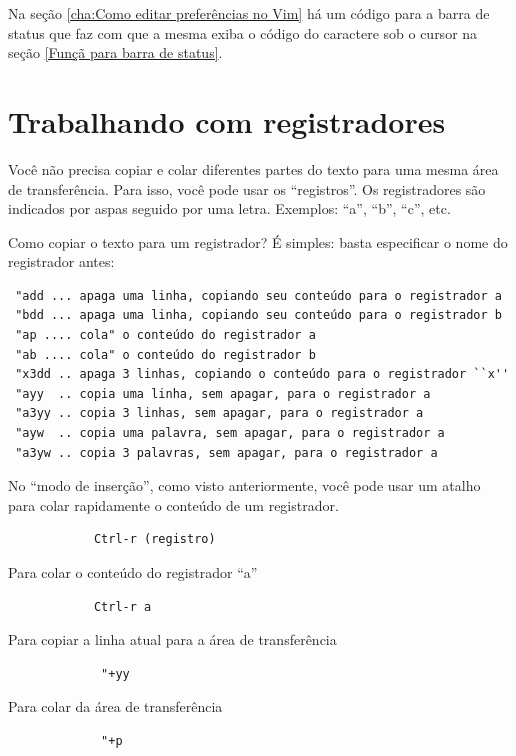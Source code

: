 \documentclass[10pt,a4paper,openany]{book}
\begin{document}
Na seção \ref{cha:Como editar preferências no Vim} há um código para a barra de
status que faz com que a mesma exiba o código do caractere sob o cursor na
seção \ref{Funçã para barra de status}.

\section{Trabalhando com registradores}
\label{Trabalhando com registradores}

Você não precisa copiar e colar diferentes partes do texto para uma
mesma área de transferência.  Para isso, você pode usar os
``registros''.  Os registradores são indicados por aspas seguido por uma letra.
Exemplos: ``a'', ``b'', ``c'', etc.

Como copiar o texto para um registrador? É simples: basta especificar
o nome do registrador antes:

\begin{verbatim}
 "add ... apaga uma linha, copiando seu conteúdo para o registrador a
 "bdd ... apaga uma linha, copiando seu conteúdo para o registrador b
 "ap .... cola" o conteúdo do registrador a
 "ab .... cola" o conteúdo do registrador b
 "x3dd .. apaga 3 linhas, copiando o conteúdo para o registrador ``x''
 "ayy  .. copia uma linha, sem apagar, para o registrador a
 "a3yy .. copia 3 linhas, sem apagar, para o registrador a
 "ayw  .. copia uma palavra, sem apagar, para o registrador a
 "a3yw .. copia 3 palavras, sem apagar, para o registrador a
\end{verbatim}

No ``modo de inserção'', como visto anteriormente, você pode usar um atalho
para colar rapidamente o conteúdo de um registrador.

\begin{verbatim}
			Ctrl-r (registro)
\end{verbatim}

Para colar o conteúdo do registrador ``a''

\begin{verbatim}
			Ctrl-r a
\end{verbatim}

Para copiar a linha atual para a área de transferência

\begin{verbatim}
			 "+yy
\end{verbatim}

Para colar da área de transferência

\begin{verbatim}
			 "+p
\end{verbatim}
\end{document}
